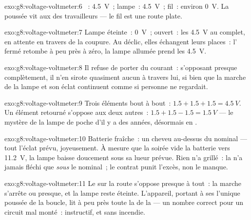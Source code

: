 \begin{solution}{exo:g8:voltage-voltmeter:6}
~: \qty{4.5}{V}~; lampe~: \qty{4.5}{V}~; fil~: environ
\qty{0}{V}. La poussée vit aux  des travailleurs --- le fil est
une route plate.
\end{solution}

\begin{solution}{exo:g8:voltage-voltmeter:7}
Lampe éteinte~: \qty{0}{V}~;  ouvert~: les \qty{4.5}{V}
au complet, en attente en travers de la coupure. Au déclic, elles
échangent leurs places~: l' fermé retombe à peu près à
zéro, la lampe allumée prend les \qty{4.5}{V}.
\end{solution}

\begin{solution}{exo:g8:voltage-voltmeter:8}
Il refuse de porter du courant~: s'opposant presque complètement, il
n'en sirote quasiment aucun à travers lui, si bien que la marche de
la lampe et son éclat continuent comme si personne ne regardait.
\end{solution}

\begin{solution}{exo:g8:voltage-voltmeter:9}
Trois éléments bout à bout~: $1.5 + 1.5 + 1.5 = \qty{4.5}{V}$. Un
élément retourné s'oppose aux deux autres~:
$1.5 + 1.5 - 1.5 = \qty{1.5}{V}$ --- le mystère de la lampe de poche
d'il y a des années, désormais en .
\end{solution}

\begin{solution}{exo:g8:voltage-voltmeter:10}
Batterie fraîche~: un cheveu au-dessus du nominal --- tout l'éclat
prévu, joyeusement. À mesure que la soirée vide la batterie vers
\qty{11.2}{V}, la lampe baisse doucement sous sa lueur prévue. Rien
n'a grillé~: la  n'a jamais fléchi que \emph{sous} le
nominal~; le contrat punit l'excès, non le manque.
\end{solution}

\begin{solution}{exo:g8:voltage-voltmeter:11}
Le  sur la route s'oppose presque à tout~: la marche
s'arrête ou presque, et la lampe reste éteinte. L'appareil, portant à
ses  l'unique poussée de la boucle, lit à peu près toute la
 de la  --- un nombre correct pour un circuit mal monté~:
instructif, et sans incendie.
\end{solution}

